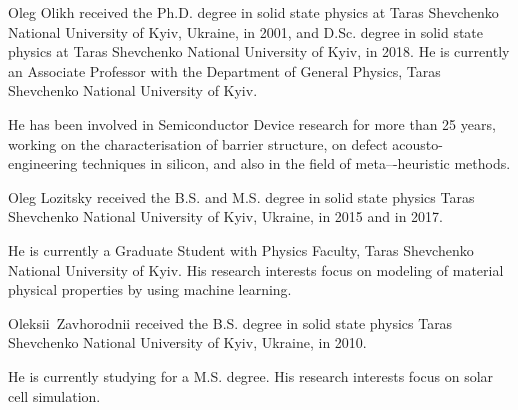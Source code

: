 \documentclass[journal]{IEEEtran}
\begin{document}
\begin{IEEEbiography}{Oleg Olikh}
 received the Ph.D. degree in solid state physics at Taras Shevchenko National University of Kyiv,  Ukraine, in 2001, and  D.Sc. degree  in solid state physics at Taras Shevchenko National University of Kyiv, in 2018.
 He is currently an Associate Professor with the Department of General Physics, Taras Shevchenko National University of Kyiv.

 He has been involved in Semiconductor Device research for more than 25 years,
 working on the characterisation of barrier structure, on
 defect acousto-engineering techniques in silicon, and also in
 the field of meta–-heuristic methods.

%
%
\end{IEEEbiography}

\begin{IEEEbiographynophoto}{Oleg Lozitsky}
received the B.S. and M.S. degree in solid state physics
Taras Shevchenko National University of Kyiv,  Ukraine, in 2015
and in 2017.

He is currently a Graduate Student with Physics Faculty, Taras Shevchenko National University of Kyiv.
His research interests focus on modeling of material physical properties by using machine learning.
\end{IEEEbiographynophoto}


\begin{IEEEbiographynophoto}{Oleksii~Zavhorodnii}
received the B.S. degree in solid state physics
Taras Shevchenko National University of Kyiv,  Ukraine, in 2010.

He is currently studying for a M.S. degree.
His research interests focus on solar cell simulation.
\end{IEEEbiographynophoto}



\end{document}
